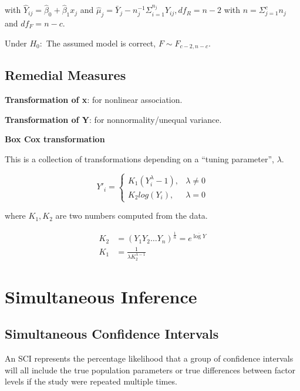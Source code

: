 \documentclass[10pt]{article}
\begin{document}
\begin{multicols}{3}
    with $\hat Y_{ij} = \hat\beta_0 + \hat\beta_1 x_j$
    and $\hat \mu_j = \bar Y_j - n_j^{-1} \Sigma_{i=1}^{n_j} Y_{ij}, df_R = n-2$ with $n = \Sigma_{j=1}^c n_j$ and $df_F = n-c$.

    Under $H_0:$ The assumed model is correct, $F\sim F_{c-2, n-c}$.

    \subsection{Remedial Measures}

    \textbf{Transformation of x}: for nonlinear association.

    \textbf{Transformation of Y}: for nonnormality/unequal variance.

    \textbf{Box Cox transformation}

    This is a collection of transformations depending on a ``tuning parameter'', $\lambda$.

    \begin{equation}
        Y'_i = \begin{cases}
            K_1 (Y_i^\lambda - 1), & \lambda \ne 0 \\
            K_2 log(Y_i),          & \lambda = 0
        \end{cases}
    \end{equation}

    where $K_1, K_2$ are two numbers computed from the data.

    \begin{align}
        K_2 & = (Y_1 Y_2 \dots Y_n)^{\frac{1}{n}} = e^{ \overline{\log Y} } \\
        K_1 & = \frac{1}{\lambda K_2^{\lambda - 1}}
    \end{align}

    \section{Simultaneous Inference}

    \subsection{Simultaneous Confidence Intervals}

    An SCI represents the percentage likelihood that a group of confidence intervals will all include the true population parameters or true differences between factor levels if the study were repeated multiple times.


\end{multicols}
\end{document}
